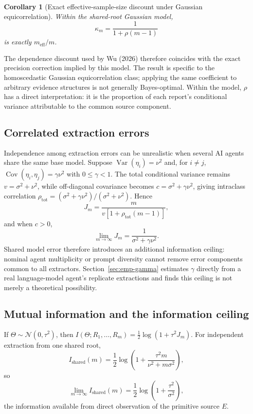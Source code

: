 \documentclass[11pt]{article}
\newtheorem{corollary}{Corollary}
\theoremstyle{definition}
\begin{document}
\begin{corollary}[Exact effective-sample-size discount under Gaussian equicorrelation]
\label{cor:m-eff}
Within the shared-root Gaussian model,
\[
\kappa_m
=
\frac{1}{1+\rho(m-1)}
\]
is exactly $m_{\mathrm{eff}}/m$.
\end{corollary}

The dependence discount used by Wu (2026) therefore coincides with the exact precision correction implied by this model. The result is specific to the homoscedastic Gaussian equicorrelation class; applying the same coefficient to arbitrary evidence structures is not generally Bayes-optimal. Within the model, $\rho$ has a direct interpretation: it is the proportion of each report's conditional variance attributable to the common source component.

\subsection{Correlated extraction errors}
\label{sec:correlated-extraction}

Independence among extraction errors can be unrealistic when several AI agents share the same base model. Suppose $\operatorname{Var}(\eta_i)=\nu^2$ and, for $i\neq j$, $\operatorname{Cov}(\eta_i,\eta_j)=\gamma\nu^2$ with $0\leq\gamma<1$. The total conditional variance remains $v=\sigma^2+\nu^2$, while off-diagonal covariance becomes $c=\sigma^2+\gamma\nu^2$, giving intraclass correlation $\rho_{\mathrm{tot}}=(\sigma^2+\gamma\nu^2)/(\sigma^2+\nu^2)$. Hence
\[
J_m
=
\frac{m}
{v[1+\rho_{\mathrm{tot}}(m-1)]},
\]
and when $c>0$,
\[
\lim_{m\rightarrow\infty}J_m
=
\frac{1}{\sigma^2+\gamma\nu^2}.
\]
Shared model error therefore introduces an additional information ceiling: nominal agent multiplicity or prompt diversity cannot remove error components common to all extractors. Section~\ref{sec:emp-gamma} estimates $\gamma$ directly from a real language-model agent's replicate extractions and finds this ceiling is not merely a theoretical possibility.

\subsection{Mutual information and the information ceiling}
\label{sec:mutual-info}

If $\Theta\sim\mathcal N(0,\tau^2)$, then $I(\Theta;R_1,\ldots,R_m)=\frac12\log(1+\tau^2J_m)$. For independent extraction from one shared root,
\[
I_{\mathrm{shared}}(m)
=
\frac12
\log\left(
1+
\frac{\tau^2m}{\nu^2+m\sigma^2}
\right),
\]
so
\[
\lim_{m\rightarrow\infty}
I_{\mathrm{shared}}(m)
=
\frac12
\log\left(
1+\frac{\tau^2}{\sigma^2}
\right),
\]
the information available from direct observation of the primitive source $E$.
\end{document}
